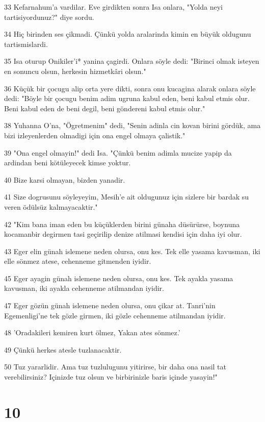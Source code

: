 \par 33 Kefarnahum'a vardilar. Eve girdikten sonra Isa onlara, "Yolda neyi tartisiyordunuz?" diye sordu.
\par 34 Hiç birinden ses çikmadi. Çünkü yolda aralarinda kimin en büyük oldugunu tartismislardi.
\par 35 Isa oturup Onikiler'i* yanina çagirdi. Onlara söyle dedi: "Birinci olmak isteyen en sonuncu olsun, herkesin hizmetkâri olsun."
\par 36 Küçük bir çocugu alip orta yere dikti, sonra onu kucagina alarak onlara söyle dedi: "Böyle bir çocugu benim adim ugruna kabul eden, beni kabul etmis olur. Beni kabul eden de beni degil, beni göndereni kabul etmis olur."
\par 38 Yuhanna O'na, "Ögretmenim" dedi, "Senin adinla cin kovan birini gördük, ama bizi izleyenlerden olmadigi için ona engel olmaya çalistik."
\par 39 "Ona engel olmayin!" dedi Isa. "Çünkü benim adimla mucize yapip da ardindan beni kötüleyecek kimse yoktur.
\par 40 Bize karsi olmayan, bizden yanadir.
\par 41 Size dogrusunu söyleyeyim, Mesih'e ait oldugunuz için sizlere bir bardak su veren ödülsüz kalmayacaktir."
\par 42 "Kim bana iman eden bu küçüklerden birini günaha düsürürse, boynuna kocamanbir degirmen tasi geçirilip denize atilmasi kendisi için daha iyi olur.
\par 43 Eger elin günah islemene neden olursa, onu kes. Tek elle yasama kavusman, iki elle sönmez atese, cehenneme gitmenden iyidir.
\par 45 Eger ayagin günah islemene neden olursa, onu kes. Tek ayakla yasama kavusman, iki ayakla cehenneme atilmandan iyidir.
\par 47 Eger gözün günah islemene neden olursa, onu çikar at. Tanri'nin Egemenligi'ne tek gözle girmen, iki gözle cehenneme atilmandan iyidir.
\par 48 'Oradakileri kemiren kurt ölmez, Yakan ates sönmez.'
\par 49 Çünkü herkes atesle tuzlanacaktir.
\par 50 Tuz yararlidir. Ama tuz tuzlulugunu yitirirse, bir daha ona nasil tat verebilirsiniz? Içinizde tuz olsun ve birbirinizle baris içinde yasayin!"

\chapter{10}

